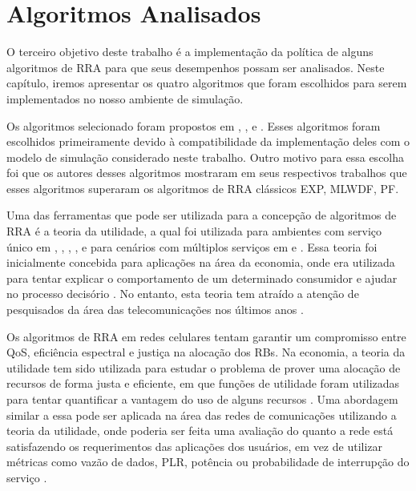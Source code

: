 \chapter[Algoritmos Analisados]{Algoritmos Analisados}
\label{benchmarking}

O terceiro objetivo deste trabalho é a implementação da política de alguns algoritmos de RRA para que seus desempenhos possam ser analisados. Neste capítulo, iremos apresentar os quatro algoritmos que foram escolhidos para serem implementados no nosso ambiente de simulação. 

Os algoritmos selecionado foram propostos em , ,  e .
Esses algoritmos foram escolhidos primeiramente devido à compatibilidade da implementação deles com o modelo de simulação considerado neste trabalho. Outro motivo para essa escolha foi que os autores desses algoritmos mostraram em seus respectivos trabalhos que esses algoritmos superaram os algoritmos de RRA clássicos EXP, MLWDF, PF.

Uma das ferramentas que pode ser utilizada para a concepção de algoritmos de RRA é a teoria da utilidade, a qual foi utilizada para ambientes com serviço único em , , , , e para cenários com múltiplos serviços em  e  . Essa teoria foi inicialmente concebida para aplicações na área da economia, onde era utilizada para tentar explicar o comportamento de um determinado consumidor e ajudar no processo decisório \cite{fishburn1968utility,north1968tutorial}. No entanto, esta teoria tem atraído a atenção de pesquisados da área das telecomunicações nos últimos anos \cite{rodrigues2011adaptive}.

Os algoritmos de RRA em redes celulares tentam garantir um compromisso entre QoS, eficiência espectral e justiça na alocação dos RBs. Na economia, a teoria da utilidade tem sido utilizada para estudar o problema de prover uma alocação de recursos de forma justa e eficiente, em que funções de utilidade foram utilizadas para tentar quantificar a vantagem do uso de alguns recursos \cite{Art:Song2005_Commag}. Uma abordagem similar a essa pode ser aplicada na área das redes de comunicações utilizando a teoria da utilidade, onde poderia ser feita uma avaliação do quanto a rede está satisfazendo os requerimentos das aplicações dos usuários, em vez de utilizar métricas como vazão de dados, PLR, potência ou probabilidade de interrupção do serviço \cite{shenker1995fundamental}. 

